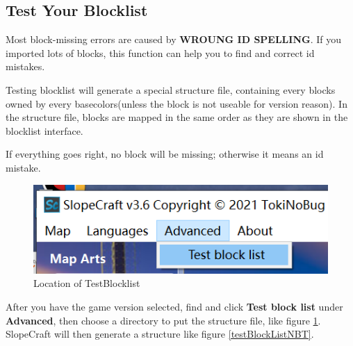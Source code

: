 \documentclass{article}
\begin{document}
    \subsection{Test Your Blocklist}
    Most block-missing errors are caused by \textbf{WROUNG ID SPELLING}. If you imported lots of blocks, this function can help you to find and correct id mistakes.

    Testing blocklist will generate a special structure file, containing every blocks owned by every basecolors(unless the block is not useable for version reason). In the structure file, blocks are mapped in the same order as they are shown in the blocklist interface.
    
    If everything goes right, no block will be missing; otherwise it means an id mistake.
    
    \begin{figure}[htbp]
        \centering
        \includegraphics[width=15cm]{Img9_TestBlockList.png}
        \caption{Location of TestBlocklist}
        \label{locOfTestBlockList}
    \end{figure}

    After you have the game version selected, find and click \textbf{Test block list} under \textbf{Advanced}, then choose a directory to put the structure file, like figure \ref*{locOfTestBlockList}. SlopeCraft will then generate a structure like figure \ref*{testBlockListNBT}.
\end{document}
